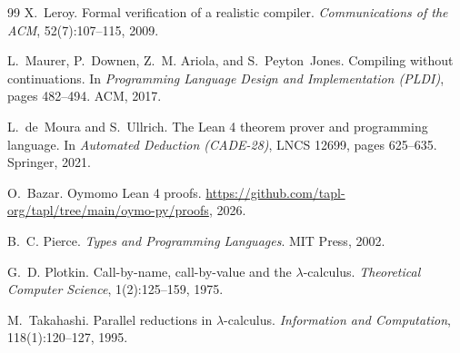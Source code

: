 \documentclass[11pt,letterpaper]{article}
\begin{document}
\begin{thebibliography}{99}
X.~Leroy.
Formal verification of a realistic compiler.
\textit{Communications of the ACM}, 52(7):107--115, 2009.

L.~Maurer, P.~Downen, Z.~M. Ariola, and S.~Peyton~Jones.
Compiling without continuations.
In \textit{Programming Language Design and Implementation (PLDI)},
pages 482--494. ACM, 2017.

L.~de~Moura and S.~Ullrich.
The Lean 4 theorem prover and programming language.
In \textit{Automated Deduction (CADE-28)}, LNCS 12699, pages 625--635.
Springer, 2021.

O.~Bazar.
Oymomo Lean 4 proofs.
\url{https://github.com/tapl-org/tapl/tree/main/oymo-py/proofs}, 2026.

B.~C. Pierce.
\textit{Types and Programming Languages}.
MIT Press, 2002.

G.~D. Plotkin.
Call-by-name, call-by-value and the $\lambda$-calculus.
\textit{Theoretical Computer Science}, 1(2):125--159, 1975.

M.~Takahashi.
Parallel reductions in $\lambda$-calculus.
\textit{Information and Computation}, 118(1):120--127, 1995.

\end{thebibliography}
\end{document}
